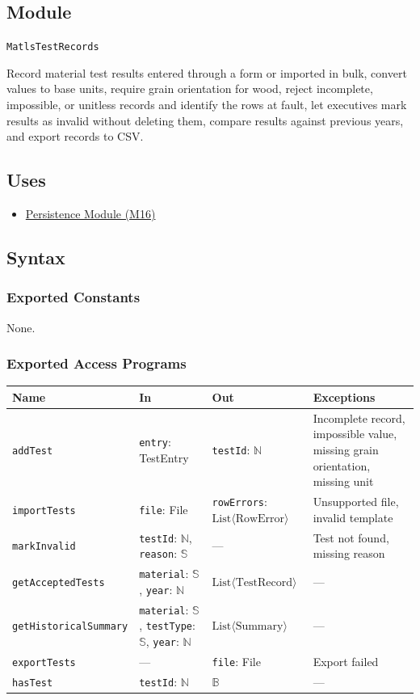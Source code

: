 \documentclass[12pt, titlepage]{article}
\begin{document}
\subsection{Module}
\texttt{MatlsTestRecords}

Record material test results entered through a form or imported in bulk, convert values to base units, require grain orientation for wood, reject incomplete, impossible, or unitless records and identify the rows at fault, let executives mark results as invalid without deleting them, compare results against previous years, and export records to CSV.

\subsection{Uses}
\begin{itemize}
  \item \hyperref[mPersist]{Persistence Module (M16)}
\end{itemize}

\subsection{Syntax}

\subsubsection{Exported Constants}
None.

\subsubsection{Exported Access Programs}
\begin{tabularx}{\textwidth}{p{4.2cm} p{4.7cm} p{3.2cm} X}
\toprule
\textbf{Name} & \textbf{In} & \textbf{Out} & \textbf{Exceptions} \\
\midrule
\texttt{addTest} & \texttt{entry}: TestEntry & \texttt{testId}: $\mathbb{N}$ & Incomplete record, impossible value, missing grain orientation, missing unit \\
\texttt{importTests} & \texttt{file}: File & \texttt{rowErrors}: $\text{List}\langle \text{RowError} \rangle$ & Unsupported file, invalid template \\
\texttt{markInvalid} & \texttt{testId}: $\mathbb{N}$, \texttt{reason}: $\mathbb{S}$ & --- & Test not found, missing reason \\
\texttt{getAcceptedTests} & \texttt{material}: $\mathbb{S}$, \texttt{year}: $\mathbb{N}$ & $\text{List}\langle \text{TestRecord} \rangle$ & --- \\
\texttt{getHistoricalSummary} & \texttt{material}: $\mathbb{S}$, \texttt{testType}: $\mathbb{S}$, \texttt{year}: $\mathbb{N}$ & $\text{List}\langle \text{Summary} \rangle$ & --- \\
\texttt{exportTests} & --- & \texttt{file}: File & Export failed \\
\texttt{hasTest} & \texttt{testId}: $\mathbb{N}$ & $\mathbb{B}$ & --- \\
\bottomrule
\end{tabularx}
\end{document}
